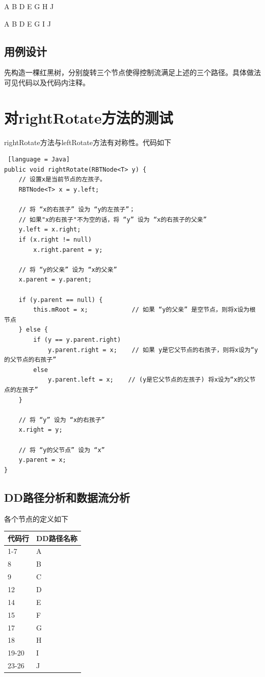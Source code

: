 \documentclass[12pt, a4paper, oneside]{ctexart}
\begin{document}
A B D E G H J

A B D E G I J

\subsection{用例设计}

先构造一棵红黑树，分别旋转三个节点使得控制流满足上述的三个路径。具体做法可见代码以及代码内注释。

\section{对rightRotate方法的测试}

rightRotate方法与leftRotate方法有对称性。代码如下

\begin{lstlisting} [language = Java]
public void rightRotate(RBTNode<T> y) {
    // 设置x是当前节点的左孩子。
    RBTNode<T> x = y.left;

    // 将 “x的右孩子” 设为 “y的左孩子”；
    // 如果"x的右孩子"不为空的话，将 “y” 设为 “x的右孩子的父亲”
    y.left = x.right;
    if (x.right != null)
        x.right.parent = y;

    // 将 “y的父亲” 设为 “x的父亲”
    x.parent = y.parent;

    if (y.parent == null) {
        this.mRoot = x;            // 如果 “y的父亲” 是空节点，则将x设为根节点
    } else {
        if (y == y.parent.right)
            y.parent.right = x;    // 如果 y是它父节点的右孩子，则将x设为“y的父节点的右孩子”
        else
            y.parent.left = x;    // (y是它父节点的左孩子) 将x设为“x的父节点的左孩子”
    }

    // 将 “y” 设为 “x的右孩子”
    x.right = y;

    // 将 “y的父节点” 设为 “x”
    y.parent = x;
}
\end{lstlisting}

\subsection{DD路径分析和数据流分析}

各个节点的定义如下

\begin{table}[!h]
    \begin{tabular}{|l|l|}
    \hline
    代码行 & DD路径名称\\ \hline
    1-7 & A\\ \hline
    8 & B\\ \hline
    9 & C \\ \hline
    12 & D \\ \hline
    14 & E \\ \hline
    15 & F \\ \hline
    17 & G \\ \hline
    18 & H \\ \hline
    19-20 & I \\ \hline
    23-26 & J \\ \hline
    \end{tabular}
\end{table}
\end{document}
